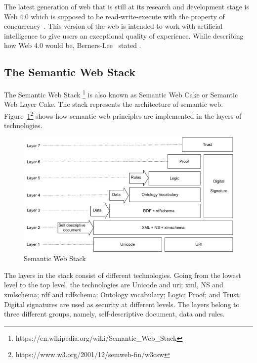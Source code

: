 \begin{doublespace}
The latest generation of web that is still at its research and development stage is Web 4.0 which is supposed to be read-write-execute with the property of concurrency~\cite{choudhury2014}. This version of the web is intended to work with artificial intelligence to give users an exceptional quality of experience. While describing how Web 4.0 would be, Berners-Lee~\cite{bernerslee1999weaving}
stated .
\subsection{The Semantic Web Stack}
\par The Semantic Web Stack
\footnote{https://en.wikipedia.org/wiki/Semantic\_Web\_Stack} is also known as Semantic Web Cake or Semantic Web Layer Cake. The stack represents the architecture of semantic web. Figure~\ref{fig:2.3}\footnote{https://www.w3.org/2001/12/semweb-fin/w3csw} shows how semantic web principles are implemented in the layers of technologies.
\begin{figure}[htp]
    \centering
    \includegraphics[width=15cm]{images/ch2/Figure3.png}
    \caption{Semantic Web Stack}
    \label{fig:2.3}
\end{figure}
\par The layers in the stack consist of different technologies. Going from the lowest level to the top level, the technologies are Unicode and \ac{uri}; \ac{xml}, NS and xmlschema; \ac{rdf} and rdfschema; Ontology vocabulary; Logic; Proof; and Trust. Digital signatures are used as security at different levels. The layers belong to three different groups, namely, self-descriptive document, data and rules.

\end{doublespace}
